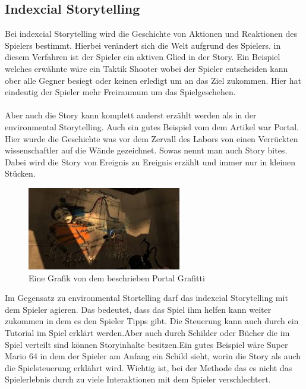 \subsection{Indexcial Storytelling}
Bei indexcial Storytelling wird die Geschichte von Aktionen und Reaktionen des Spielers bestimmt. Hierbei verändert sich die Welt aufgrund des Spielers. in diesem Verfahren ist der Spieler ein aktiven Glied in der Story. Ein Beispiel welches  erwähnte wäre ein Taktik Shooter wobei der Spieler entscheiden kann ober alle Gegner besiegt oder keinen erledigt um an das Ziel zukommen. Hier hat eindeutig der Spieler mehr Freiraumum um das Spielgeschehen.\\\\
Aber auch die Story kann komplett anderst erzählt werden als in der environmental Storytelling. Auch ein gutes Beispiel vom dem Artikel  war Portal. Hier wurde die Geschichte was vor dem Zervall des Labors von einen Verrückten wissenschaftler auf die Wände gezeichnet. Sowas nennt man auch Story bites. Dabei wird die Story von Ereignis zu Ereignis erzählt und immer nur in kleinen Stücken.
\begin{figure}[H]
    \centering
    \includegraphics[width=0.6\textwidth]{chapters/15/images/Portal.png}
    \caption{Eine Grafik von dem beschrieben Portal Grafitti}
    \label{UST-6}
\end{figure}
Im Gegensatz zu environmental Stortelling darf das indexcial Storytelling mit dem Spieler agieren. Das bedeutet, dass das Spiel ihm helfen kann weiter zukommen in dem es den Spieler Tipps gibt. Die Steuerung kann auch durch ein Tutorial im Spiel erklärt werden.Aber auch durch Schilder oder Bücher die im Spiel verteilt sind können Storyinhalte besitzen.Ein gutes Beispiel wäre Super Mario 64 in dem der Spieler am Anfang ein Schild sieht, worin die Story als auch die Spielsteuerung erklährt wird. Wichtig ist, bei der Methode das es nicht das Spielerlebnis durch zu viele Interaktionen mit dem Spieler verschlechtert. 

